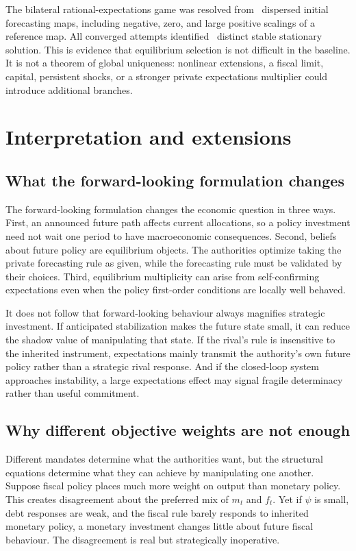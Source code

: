 \documentclass[11pt]{article}
\begin{document}
The bilateral rational-expectations game was resolved from
\NKSearchAttempts\ dispersed initial forecasting maps, including negative,
zero, and large positive scalings of a reference map. All converged attempts
identified \NKDistinctSolutions\ distinct stable stationary solution. This is
evidence that equilibrium selection is not difficult in the baseline. It is
not a theorem of global uniqueness: nonlinear extensions, a fiscal limit,
capital, persistent shocks, or a stronger private expectations multiplier
could introduce additional branches.

\section{Interpretation and extensions}

\subsection{What the forward-looking formulation changes}

The forward-looking formulation changes the economic question in three ways.
First, an announced future path affects current allocations, so a policy
investment need not wait one period to have macroeconomic consequences.
Second, beliefs about future policy are equilibrium objects. The authorities
optimize taking the private forecasting rule as given, while the forecasting
rule must be validated by their choices. Third, equilibrium multiplicity can
arise from self-confirming expectations even when the policy first-order
conditions are locally well behaved.

It does not follow that forward-looking behaviour always magnifies strategic
investment. If anticipated stabilization makes the future state small, it can
reduce the shadow value of manipulating that state. If the rival's rule is
insensitive to the inherited instrument, expectations mainly transmit the
authority's own future policy rather than a strategic rival response. And if
the closed-loop system approaches instability, a large expectations effect may
signal fragile determinacy rather than useful commitment.

\subsection{Why different objective weights are not enough}

Different mandates determine what the authorities want, but the structural
equations determine what they can achieve by manipulating one another. Suppose
fiscal policy places much more weight on output than monetary policy. This
creates disagreement about the preferred mix of $m_t$ and $f_t$. Yet if
$\psi$ is small, debt responses are weak, and the fiscal rule barely responds
to inherited monetary policy, a monetary investment changes little about
future fiscal behaviour. The disagreement is real but strategically
inoperative.
\end{document}
